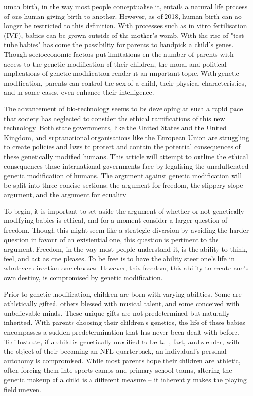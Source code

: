 
   uman birth, in the way most people conceptualise it, entails a natural
   life process of one human giving birth to another. However, as of 2018,
   human birth can no longer be restricted to this definition. With
   processes such as in vitro fertilisation (IVF), babies can be grown
   outside of the mother's womb. With the rise of "test tube babies" has
   come the possibility for parents to handpick a child's genes. Though
   socioeconomic factors put limitations on the number of parents with
   access to the genetic modification of their children, the moral and
   political implications of genetic modification render it an important
   topic. With genetic modification, parents can control the sex of a
   child, their physical characteristics, and in some cases, even enhance
   their intelligence.

   The advancement of bio-technology seems to be developing at such a
   rapid pace that society has neglected to consider the ethical
   ramifications of this new technology. Both state governments, like the
   United States and the United Kingdom, and supranational organisations
   like the European Union are struggling to create policies and laws to
   protect and contain the potential consequences of these genetically
   modified humans. This article will attempt to outline the ethical
   consequences these international governments face by legalising the
   unadulterated genetic modification of humans. The argument against
   genetic modification will be split into three concise sections: the
   argument for freedom, the slippery slope argument, and the argument for
   equality.

   To begin, it is important to set aside the argument of whether or not
   genetically modifying babies is ethical, and for a moment consider a
   larger question of freedom. Though this might seem like a strategic
   diversion by avoiding the harder question in favour of an existential
   one, this question is pertinent to the argument. Freedom, in the way
   most people understand it, is the ability to think, feel, and act as
   one pleases. To be free is to have the ability steer one's life in
   whatever direction one chooses. However, this freedom, this ability to
   create one's own destiny, is compromised by genetic modification.

   Prior to genetic modification, children are born with varying
   abilities. Some are athletically gifted, others blessed with musical
   talent, and some conceived with unbelievable minds. These unique gifts
   are not predetermined but naturally inherited. With parents choosing
   their children's genetics, the life of these babies encompasses a
   sudden predetermination that has never been dealt with before. To
   illustrate, if a child is genetically modified to be tall, fast, and
   slender, with the object of their becoming an NFL quarterback, an
   individual's personal autonomy is compromised. While most parents hope
   their children are athletic, often forcing them into sports camps and
   primary school teams, altering the genetic makeup of a child is a
   different measure -- it inherently makes the playing field uneven.

